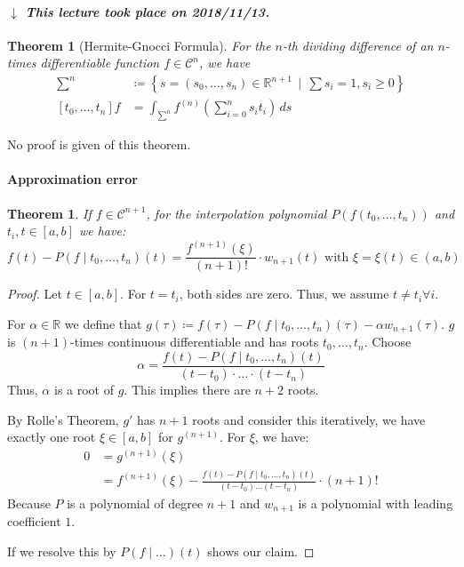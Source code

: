 \documentclass[a4paper]{article}
\newcounter{lecref}[section]
\numberwithin{lecref}{section}
\theoremstyle{break}
\newtheorem{thm}[lecref]{Theorem}
\newcommand{\dateref}[1]{%
  \begin{mdframed}[backgroundcolor=gray!10,innerbottommargin=0pt,innertopmargin=0pt]
    \paragraph{\textit{$\downarrow$ This lecture took place on #1.}}%
  \end{mdframed}%
}
\newcommand{\SetDef}[2]{\left\{#1\,\mid\,#2\right\}}
\begin{document}
\dateref{2018/11/13}

\begin{thm}[Hermite-Gnocci Formula]
  \label{theorem:4-12}
  For the $n$-th dividing difference of an $n$-times differentiable function $f \in \mathcal C^n$, we have
  \begin{align*}
    \sum^n &\coloneqq \SetDef{s = (s_0, \dots, s_n) \in \mathbb R^{n+1}}{\sum s_i = 1, s_i \geq 0} \\
    [t_0, \dots, t_n] f &= \int_{\sum^n} f^{(n)} \left(\sum_{i=0}^n s_i t_i\right) \, ds
  \end{align*}
\end{thm}

No proof is given of this theorem.

\paragraph{Approximation error}

\begin{thm}
  \label{theorem:4-13}
  If $f \in \mathcal C^{n+1}$, for the interpolation polynomial $P(f(t_0, \dots, t_n))$ and $t_i, t \in [a,b]$ we have:
  \[ f(t) - P(f \mid t_0, \dots, t_n)(t) = \frac{f^{(n+1)}(\xi)}{(n+1)!} \cdot w_{n+1}(t) \text{ with } \xi = \xi(t) \in (a,b) \]
\end{thm}

\begin{proof}
  Let $t \in [a,b]$. For $t = t_i$, both sides are zero. Thus, we assume $t \neq t_i \forall i$.

  For $\alpha \in \mathbb R$ we define that $g(\tau) \coloneqq f(\tau) - P(f \mid t_0, \dots, t_n)(\tau) - \alpha w_{n+1}(\tau)$.
  $g$ is $(n+1)$-times continuous differentiable and has roots $t_0, \dots, t_n$. Choose
  \[ \alpha = \frac{f(t) - P(f \mid t_0, \dots, t_n)(t)}{(t - t_0) \cdot \dots \cdot (t - t_n)} \]
  Thus, $\alpha$ is a root of $g$. This implies there are $n+2$ roots.

  By Rolle's Theorem, $g'$ has $n+1$ roots and consider this iteratively, we have exactly one root $\xi \in [a,b]$ for $g^{(n+1)}$.
  For $\xi$, we have:
  \begin{align*}
    0 &= g^{(n+1)}(\xi) \\
      &= f^{(n+1)}(\xi) - \frac{f(t) - P(f \mid t_0, \dots, t_n)(t)}{(t - t_0) \dots (t - t_n)} \cdot (n+1)!
  \end{align*}
  Because $P$ is a polynomial of degree $n+1$ and $w_{n+1}$ is a polynomial with leading coefficient $1$.

  If we resolve this by $P(f\mid\dots)(t)$ shows our claim.
\end{proof}
\end{document}
